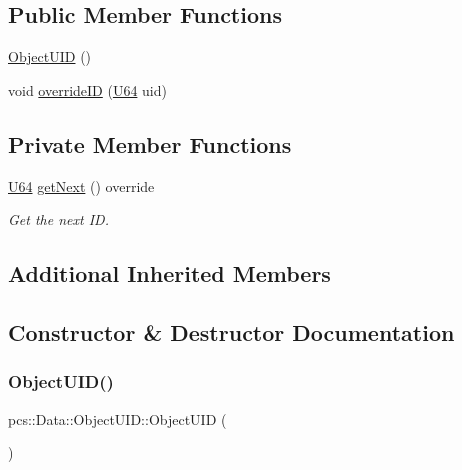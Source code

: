 \subsection*{Public Member Functions}
\begin{DoxyCompactItemize}
\item 
\hyperlink{classpcs_1_1Data_1_1ObjectUID_a04780c31ec526182ea5abf7351e84459}{Object\+U\+ID} ()
\item 
void \hyperlink{classpcs_1_1Data_1_1ObjectUID_a8ceb01cdc531488d8033f7eeb07cb796}{override\+ID} (\hyperlink{namespacepcs_1_1Data_a9aad6b21cf2fcd3515ecc3bbd069eb34}{U64} uid)
\end{DoxyCompactItemize}
\subsection*{Private Member Functions}
\begin{DoxyCompactItemize}
\item 
\hyperlink{namespacepcs_1_1Data_a9aad6b21cf2fcd3515ecc3bbd069eb34}{U64} \hyperlink{classpcs_1_1Data_1_1ObjectUID_a1a1cc75b0ed7e6c04f2f5daa33e0193e}{get\+Next} () override
\begin{DoxyCompactList}\small\item\em Get the next ID. \end{DoxyCompactList}\end{DoxyCompactItemize}
\subsection*{Additional Inherited Members}


\subsection{Constructor \& Destructor Documentation}
\mbox{\label{classpcs_1_1Data_1_1ObjectUID_a04780c31ec526182ea5abf7351e84459}} 
\subsubsection{\texorpdfstring{Object\+U\+I\+D()}{ObjectUID()}}
{\footnotesize\ttfamily pcs\+::\+Data\+::\+Object\+U\+I\+D\+::\+Object\+U\+ID (\begin{DoxyParamCaption}{ }\end{DoxyParamCaption})\hspace{0.3cm}{\ttfamily [inline]}}



